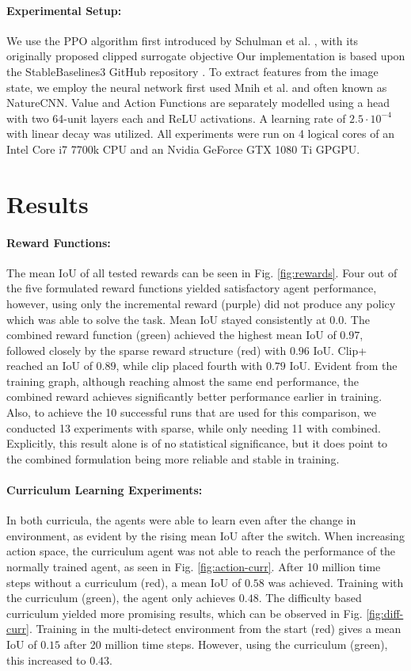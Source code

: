 \documentclass[11pt]{article} %
\begin{document}
\paragraph{Experimental Setup:}
We use the PPO algorithm first introduced by Schulman et al. \cite{schulman_proximal_2017}, with its originally proposed clipped surrogate objective
Our implementation is based upon the StableBaselines3 GitHub repository \cite{stable-baselines3}.
To extract features from the image state, we employ the neural network first used Mnih et al. \cite{mnih_human-level_2015} and often known as NatureCNN. 
Value and Action Functions are separately modelled using a head with two 64-unit layers each and ReLU activations.
A learning rate of $2.5 \cdot 10^{-4}$ with linear decay was utilized.
All experiments were run on 4 logical cores of an Intel Core i7 7700k CPU and an Nvidia GeForce GTX 1080 Ti GPGPU.
\section{Results}
\paragraph{Reward Functions:}
The mean IoU of all tested rewards can be seen in Fig. \ref{fig:rewards}.
Four out of the five formulated reward functions yielded satisfactory agent performance, however, using only the incremental reward (purple) did not produce any policy which was able to solve the task.
Mean IoU stayed consistently at 0.0.
The combined reward function (green)  achieved the highest mean IoU of $0.97$, followed closely by the sparse reward structure (red) with $0.96$ IoU.
Clip+ reached an IoU of $0.89$, while clip placed fourth with $0.79$ IoU.
Evident from the training graph, although reaching almost the same end performance, the combined reward achieves significantly better performance earlier in training.
Also, to achieve the 10 successful runs that are used for this comparison, we conducted 13 experiments with sparse, while only needing 11 with combined.
Explicitly, this result alone is of no statistical significance, but it does point to the combined formulation being more reliable and stable in training.

\paragraph{Curriculum Learning Experiments:}
In both curricula, the agents were able to learn even after the change in environment, as evident by the rising mean IoU after the switch. 
When increasing action space, the curriculum agent was not able to reach the performance of the normally trained agent, as seen in Fig. \ref{fig:action-curr}. 
After 10 million time steps without a curriculum (red), a mean IoU of $0.58$ was achieved. Training with the curriculum (green), the agent only achieves $0.48$.
The difficulty based curriculum yielded more promising results, which can be observed in Fig. \ref{fig:diff-curr}.
Training in the multi-detect environment from the start (red) gives a mean IoU of $0.15$ after 20 million time steps. However, using the curriculum (green), this increased to $0.43$.
\end{document}
